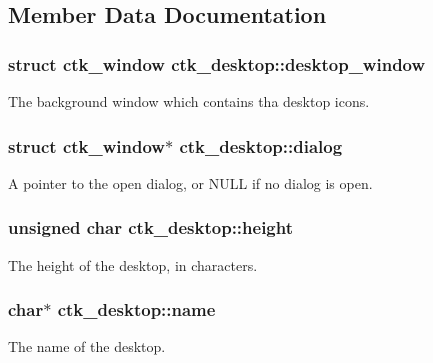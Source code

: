 \subsection{Member Data Documentation}
\hypertarget{structctk__desktop_ae50b40fab03969958331255e939616ee}{}
\subsubsection[{desktop\+\_\+window}]{\setlength{\rightskip}{0pt plus 5cm}struct {\bf ctk\+\_\+window} ctk\+\_\+desktop\+::desktop\+\_\+window}\label{structctk__desktop_ae50b40fab03969958331255e939616ee}
The background window which contains tha desktop icons. \hypertarget{structctk__desktop_ab3eb78a18c8e9e744cf1b529041704d0}{}
\subsubsection[{dialog}]{\setlength{\rightskip}{0pt plus 5cm}struct {\bf ctk\+\_\+window}$\ast$ ctk\+\_\+desktop\+::dialog}\label{structctk__desktop_ab3eb78a18c8e9e744cf1b529041704d0}
A pointer to the open dialog, or N\+U\+L\+L if no dialog is open. \hypertarget{structctk__desktop_aed82ebe84d80a552b4766badac4bb9db}{}
\subsubsection[{height}]{\setlength{\rightskip}{0pt plus 5cm}unsigned char ctk\+\_\+desktop\+::height}\label{structctk__desktop_aed82ebe84d80a552b4766badac4bb9db}
The height of the desktop, in characters. \hypertarget{structctk__desktop_aca68c318930404e60482bf1e69ea0852}{}
\subsubsection[{name}]{\setlength{\rightskip}{0pt plus 5cm}char$\ast$ ctk\+\_\+desktop\+::name}\label{structctk__desktop_aca68c318930404e60482bf1e69ea0852}
The name of the desktop. \hypertarget{structctk__desktop_a51920c8b038bc60c96837d0120bf6cb9}{}
